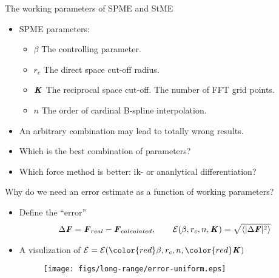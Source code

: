 \documentclass{beamer}
\newcommand{\redc}[1]{{\color{red} #1}}
\newcommand{\bluec}[1]{{\color{blue} #1}}
\newcommand{\vect}[1]{\textbf{\textit{#1}}}
\begin{document}
\begin{frame}{The working parameters of SPME and StME}
  \begin{itemize}
  \vfill
  \item <1->
    SPME parameters:
  \vfill
    \begin{itemize}
    \item \redc{$\beta$} \quad The controlling parameter.
    \item \redc{$r_c$} \quad The direct space cut-off radius.
    \item \redc{$\vect K$} \quad The reciprocal space cut-off. The number of FFT grid points.
    \item \redc{$n$} \quad The order of cardinal B-spline interpolation.
    \end{itemize}
    \vfill
  \item <2->
    An arbitrary combination may lead to \redc{totally wrong results}.
  \item <3->
    \vfill
    Which is the \redc{best combination of parameters}?
  \item <4->
    \vfill
    \redc{Which force method} is better: ik- or ananlytical differentiation?
    \vfill
  \end{itemize}
\end{frame}

\begin{frame}{Why do we need an error estimate as a function of working parameters?}
  \begin{itemize}\itemsep-.5cm
  \item <1-> Define the ``error''
    \bluec{
    \begin{align*}
      \Delta\vect F = \vect F_{real} - \vect F_{calculated},
      \qquad \mathcal E({\beta}, r_c, n, {\vect K}) = \sqrt{\langle\vert \Delta\vect F \vert^2\rangle}
    \end{align*}}
\item<2-> A visulization of
  \bluec{$ \mathcal E =  \mathcal E(\redc{\beta}, r_c, n, \redc{\vect K})$}
    \begin{figure}
    \centering
    \texttt{[image: figs/long-range/error-uniform.eps]}
  \end{figure}
  \vfill
  \end{itemize}
\end{frame}
\end{document}
